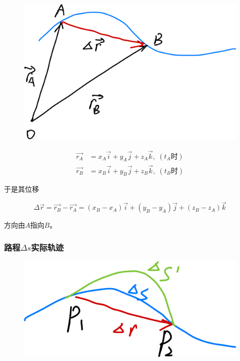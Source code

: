 \documentclass[12pt, a4paper]{article}
\begin{document}
    \begin{figure}
        \centering
        \includegraphics[scale=0.08]{"Chapter 01 images/pic3.png"}
        \label{pic3}
    \end{figure}

    \begin{align*}
        \overrightarrow{r_{A}} &=
        x_{A}\overrightarrow{i} + y_{A}\overrightarrow{j} + z_{A}\overrightarrow{k}
        ,\; \left(t_{A}\text{时}\right) \\
        \overrightarrow{r_{B}} &=
        x_{B}\overrightarrow{i} + y_{B}\overrightarrow{j} + z_{B}\overrightarrow{k}
        ,\; \left(t_{B}\text{时}\right)
    \end{align*}

    于是其位移

    \[
        \Delta \overrightarrow{r} = \overrightarrow{r_{B}} - \overrightarrow{r_{A}}
        = \left(x_{B} - x_{A}\right)\overrightarrow{i} + \left(y_{B} - y_{A}\right)\overrightarrow{j}
        + \left(z_{B} - z_{A}\right)\overrightarrow{k}
    \]
    
    方向由\(A\)指向\(B\)。

\subsubsection{路程\(\Delta s\)实际轨迹}

    \begin{figure}
        \centering
        \includegraphics[scale=0.05]{"Chapter 01 images/pic4.png"}
        \label{pic4}
    \end{figure}
\end{document}
